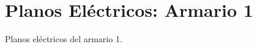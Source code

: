 
\chapter{Planos Eléctricos: Armario 1} %

\label{app:planosElectricos} %

Planos eléctricos del armario 1.

\newpage


